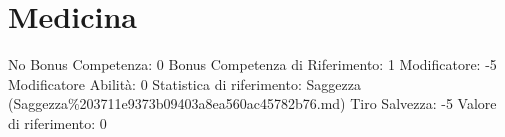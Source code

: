 \section{Medicina}\label{medicina}

\begin{description}
\tightlist
\item[Tags: ABI]
No Bonus Competenza: 0 Bonus Competenza di Riferimento: 1 Modificatore:
-5 Modificatore Abilità: 0 Statistica di riferimento: Saggezza
(Saggezza\%203711e9373b09403a8ea560ac45782b76.md) Tiro Salvezza: -5
Valore di riferimento: 0
\end{description}
